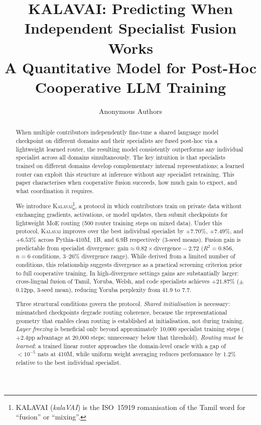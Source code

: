 \documentclass{article}
\title{KALAVAI: Predicting When Independent Specialist Fusion Works\\
       A Quantitative Model for Post-Hoc Cooperative LLM Training}
\author{%
  Anonymous Authors
}
\newcommand{\kalavai}{\textsc{Kalavai}\xspace}
\begin{document}
\maketitle

\begin{abstract}
When multiple contributors independently fine-tune a shared language model checkpoint on
different domains and their specialists are fused post-hoc via a lightweight learned router,
the resulting model consistently outperforms any individual specialist across all domains
simultaneously. The key intuition is that specialists trained on different domains develop
complementary internal representations; a learned router can exploit this structure at
inference without any specialist retraining. This paper characterises when cooperative
fusion succeeds, how much gain to expect, and what coordination it requires.

We introduce \kalavai\footnote{KALAVAI (\textit{kalaVAI}) is the ISO~15919 romanisation of the Tamil word for ``fusion'' or ``mixing''.}, a protocol in which contributors train on private data without
exchanging gradients, activations, or model updates, then submit checkpoints for lightweight
MoE routing (500 router training steps on mixed data). Under this protocol, \kalavai improves
over the best individual specialist by $+7.70\%$, $+7.49\%$, and $+6.53\%$ across Pythia-410M,
1B, and 6.9B respectively (3-seed means). Fusion gain is predictable from specialist
divergence:
$\text{gain} \approx 0.82 \times \text{divergence} - 2.72$
($R^2 = 0.856$, $n{=}6$ conditions, 3--26\% divergence range). While derived from a limited
number of conditions, this relationship suggests divergence as a practical screening criterion
prior to full cooperative training. In high-divergence settings gains are substantially
larger: cross-lingual fusion of Tamil, Yoruba, Welsh, and code specialists achieves $+21.87\%$
($\pm$0.12pp, 3-seed mean), reducing Yoruba perplexity from 41.9 to 7.7.

Three structural conditions govern the protocol. \emph{Shared initialisation} is necessary:
mismatched checkpoints degrade routing coherence, because the representational geometry
that enables clean routing is established at initialisation, not during training.
\emph{Layer freezing} is beneficial only beyond approximately 10,000 specialist training
steps ($+2.4$pp advantage at 20,000 steps; unnecessary below that threshold).
\emph{Routing must be learned}: a trained linear router approaches the domain-level oracle
with a gap of ${<}10^{-5}$ nats at 410M, while uniform weight averaging reduces performance
by $1.2\%$ relative to the best individual specialist.
\end{abstract}
\end{document}
